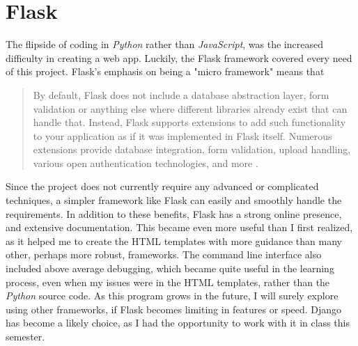 \section{Flask}
The flipside of coding in \textit{Python} rather than \textit{JavaScript}, was
the increased difficulty in creating a web app. Luckily, the Flask framework covered every need
of this project. Flask's emphasis on being a "micro framework" means that
\begin{quote}
By default, Flask does not include a database abstraction layer, form validation
or anything else where different libraries already exist that can handle that.
Instead, Flask supports extensions to add such functionality to your application
as if it was implemented in Flask itself. Numerous extensions provide database
integration, form validation, upload handling, various open authentication
technologies, and more \cite{Pallets:18}.
\end{quote}

Since the project does not currently require any advanced or complicated techniques,
a simpler framework like Flask can easily and smoothly handle the requirements.
In addition to these benefits, Flask has a strong online presence, and extensive
documentation. This became even more useful than I first realized, as it helped
me to create the HTML templates with more guidance than many other, perhaps more
robust, frameworks. The command line interface also included above average debugging,
which became quite useful in the learning process, even when my issues were in the
HTML templates, rather than the \textit{Python} source code. As this program grows
in the future, I will surely explore using other frameworks, if Flask becomes
limiting in features or speed. Django has become a likely choice, as I had the
opportunity to work with it in class this semester.
